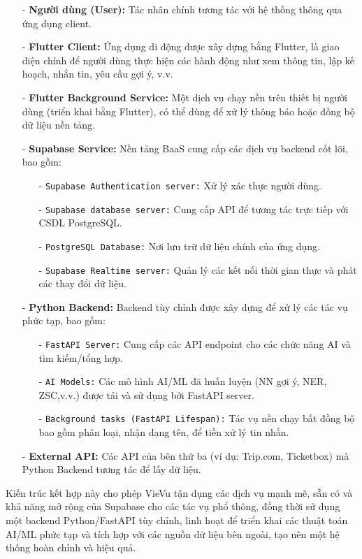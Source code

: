 \begin{enumerate}
    \item[-]\textbf{Người dùng (User):} Tác nhân chính tương tác với hệ thống thông qua ứng dụng client.
    \item[-]\textbf{Flutter Client:} Ứng dụng di động được xây dựng bằng Flutter, là giao diện chính để người dùng thực hiện các hành động như xem thông tin, lập kế hoạch, nhắn tin, yêu cầu gợi ý, v.v.
    \item[-]\textbf{Flutter Background Service:} Một dịch vụ chạy nền trên thiết bị người dùng (triển khai bằng Flutter), có thể dùng để xử lý thông báo hoặc đồng bộ dữ liệu nền tảng.
    \item[-]\textbf{Supabase Service:} Nền tảng BaaS cung cấp các dịch vụ backend cốt lõi, bao gồm:
        \begin{itemize}
            \item[-]\texttt{Supabase Authentication server:} Xử lý xác thực người dùng.
            \item[-]\texttt{Supabase database server:} Cung cấp API để tương tác trực tiếp với CSDL PostgreSQL.
            \item[-]\texttt{PostgreSQL Database:} Nơi lưu trữ dữ liệu chính của ứng dụng.
            \item[-]\texttt{Supabase Realtime server:} Quản lý các kết nối thời gian thực và phát các thay đổi dữ liệu.
        \end{itemize}
    \item[-]\textbf{Python Backend:} Backend tùy chỉnh được xây dựng để xử lý các tác vụ phức tạp, bao gồm:
        \begin{itemize}
            \item[-]\texttt{FastAPI Server:} Cung cấp các API endpoint cho các chức năng AI và tìm kiếm/tổng hợp.
            \item[-]\texttt{AI Models:} Các mô hình AI/ML đã huấn luyện (NN gợi ý, NER, ZSC,v.v.) được tải và sử dụng bởi FastAPI server.
            \item[-]\texttt{Background tasks (FastAPI Lifespan):} Tác vụ nền chạy bất đồng bộ bao gồm phân loại, nhận dạng tên, để tiền xử lý tin nhắn.
        \end{itemize}
    \item[-]\textbf{External API:} Các API của bên thứ ba (ví dụ: Trip.com, Ticketbox) mà Python Backend tương tác để lấy dữ liệu.
\end{enumerate}




\noindent Kiến trúc kết hợp này cho phép VieVu tận dụng các dịch vụ mạnh mẽ, sẵn có và khả năng mở rộng của Supabase cho các tác vụ phổ thông, đồng thời sử dụng một backend Python/FastAPI tùy chỉnh, linh hoạt để triển khai các thuật toán AI/ML phức tạp và tích hợp với các nguồn dữ liệu bên ngoài, tạo nên một hệ thống hoàn chỉnh và hiệu quả.